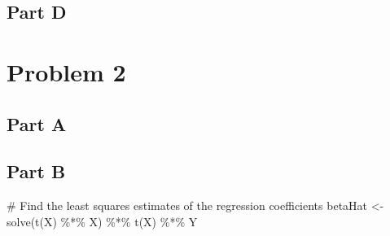 \documentclass[
  letterpaper,
  DIV=11,
  numbers=noendperiod]{scrartcl}
\newenvironment{Shaded}{}{}
\newcommand{\CommentTok}[1]{\textcolor[rgb]{0.57,0.51,0.45}{#1}}
\newcommand{\DecValTok}[1]{\textcolor[rgb]{0.96,0.45,0.00}{#1}}
\newcommand{\FunctionTok}[1]{\textcolor[rgb]{0.41,0.62,0.42}{#1}}
\newcommand{\NormalTok}[1]{\textcolor[rgb]{0.24,0.22,0.21}{#1}}
\newcommand{\OtherTok}[1]{\textcolor[rgb]{0.41,0.62,0.42}{#1}}
\newcommand{\SpecialCharTok}[1]{\textcolor[rgb]{0.69,0.38,0.53}{#1}}
\begin{document}
\newpage{}

\hypertarget{part-d}{%
\subsection{Part D}\label{part-d}}

\newpage{}

\hypertarget{problem-2}{%
\section{Problem 2}\label{problem-2}}

\hypertarget{part-a-1}{%
\subsection{Part A}\label{part-a-1}}

\begin{Shaded}
\end{Shaded}

\newpage{}

\hypertarget{part-b-1}{%
\subsection{Part B}\label{part-b-1}}

\begin{Shaded}
\begin{Highlighting}[]
\CommentTok{\# Find the least squares estimates of the regression coefficients}
\NormalTok{betaHat }\OtherTok{\textless{}{-}} \FunctionTok{solve}\NormalTok{(}\FunctionTok{t}\NormalTok{(X) }\SpecialCharTok{\%*\%}\NormalTok{ X) }\SpecialCharTok{\%*\%} \FunctionTok{t}\NormalTok{(X) }\SpecialCharTok{\%*\%}\NormalTok{ Y}
\end{Highlighting}
\end{Shaded}
\end{document}

